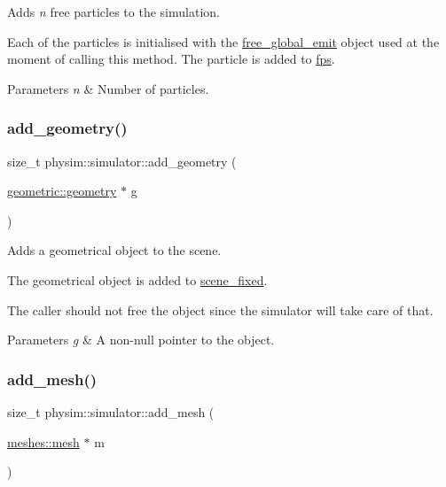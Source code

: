 Adds {\itshape n} free particles to the simulation. 

Each of the particles is initialised with the \hyperlink{classphysim_1_1simulator_a05e2840fc39c644d7005ea938e63202f}{free\+\_\+global\+\_\+emit} object used at the moment of calling this method. The particle is added to \hyperlink{classphysim_1_1simulator_a4f92b1da1d5e8e0c35d6339991b4d7ce}{fps}. 
\begin{DoxyParams}{Parameters}
{\em n} & Number of particles. \\
\hline
\end{DoxyParams}
\mbox{\label{classphysim_1_1simulator_a92a79231495f047789176a19857735ff}} 
\subsubsection{\texorpdfstring{add\+\_\+geometry()}{add\_geometry()}}
{\footnotesize\ttfamily size\+\_\+t physim\+::simulator\+::add\+\_\+geometry (\begin{DoxyParamCaption}\item[{\hyperlink{classphysim_1_1geometric_1_1geometry}{geometric\+::geometry} $\ast$}]{g }\end{DoxyParamCaption})}



Adds a geometrical object to the scene. 

The geometrical object is added to \hyperlink{classphysim_1_1simulator_a7ea652d4a55986d0c2cf527e40495fd8}{scene\+\_\+fixed}.

The caller should not free the object since the simulator will take care of that. 
\begin{DoxyParams}{Parameters}
{\em g} & A non-\/null pointer to the object. \\
\hline
\end{DoxyParams}
\mbox{\label{classphysim_1_1simulator_a65e96ed22a3d12c5be1ff933d4c79436}} 
\subsubsection{\texorpdfstring{add\+\_\+mesh()}{add\_mesh()}}
{\footnotesize\ttfamily size\+\_\+t physim\+::simulator\+::add\+\_\+mesh (\begin{DoxyParamCaption}\item[{\hyperlink{classphysim_1_1meshes_1_1mesh}{meshes\+::mesh} $\ast$}]{m }\end{DoxyParamCaption})}



